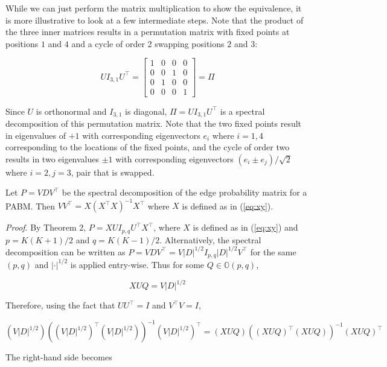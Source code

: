 \documentclass[12pt]{article}
\begin{document}
\begin{remark}
While we can just perform the matrix multiplication to show the
equivalence, it is more illustrative to look at a few intermediate steps. Note
that the product of the three inner matrices results in a permutation matrix
with fixed points at positions $1$ and $4$ and a cycle of order 2 swapping
positions $2$ and $3$:

$$U I_{3, 1} U^\top = \begin{bmatrix}
  1 & 0 & 0 & 0 \\
  0 & 0 & 1 & 0 \\
  0 & 1 & 0 & 0 \\
  0 & 0 & 0 & 1
\end{bmatrix} = \Pi$$

Since $U$ is orthonormal and $I_{3, 1}$ is diagonal, $\Pi = U I_{3, 1} U^\top$
is a spectral decomposition of this permutation matrix. Note that the two fixed
points result in eigenvalues of $+1$ with corresponding eigenvectors $e_i$
where $i = 1, 4$ corresponding to the locations of the fixed points, and the
cycle of order two results in two eigenvalues $\pm 1$ with corresponding
eigenvectors $(e_i \pm e_j) / \sqrt{2}$ where $i = 2, j = 3$, pair that is
swapped.
\end{remark}

\begin{lemma}
\label{lemma1}
Let $P = V D V^\top$ be the spectral decomposition of the edge probability
matrix for a PABM. Then $V V^\top = X (X^\top X)^{-1} X^\top$ where $X$ is
defined as in (\ref{eq:xy}).
\end{lemma}

\emph{Proof}. By Theorem 2, \(P = X U I_{p, q} U^\top X^\top\), where
\(X\) is defined as in (\ref{eq:xy}) and $p = K(K+1)/2$ and $q = K(K-1)/2$. %
Alternatively, the spectral
decomposition can be written as
\(P = V D V^\top = V |D|^{1/2} I_{p, q} |D|^{1/2} V^\top\) for the same
\((p, q)\) and \(|\cdot|^{1/2}\) is applied entry-wise. Thus for some
\(Q \in \mathbb{O}(p, q)\),

\[X U Q = V |D|^{1/2}\]

Therefore, using the fact that \(U U^\top = I\) and \(V^\top V = I\),

\[(V |D|^{1/2}) ((V |D|^{1/2})^\top (V |D|^{1/2}))^{-1} (V |D|^{1/2})^\top =
(X U Q) ((X U Q)^\top (X U Q))^{-1} (X U Q)^\top\]

The right-hand side becomes
\end{document}
